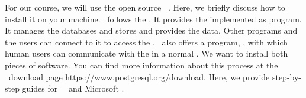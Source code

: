 %
%
\label{sec:installingPostgres}%
%
For our course, we will use the open source  \postgresql~\cite{TA2024DDAMWPAM,FP2023LP,OH2017PUAR,B2024PELUYDW}.
Here, we briefly discuss how to install it on your machine.
\postgresql\ follows the .
It provides the  implemented as  program.
It manages the databases and stores and provides the data.
Other programs and the users can connect to it to access the .
\postgresql\ also offers a  program, \psql, with which human users can communicate with the   in a normal .
We want to install both pieces of software.
You can find more information about this process at the \postgresql\ download page \url{https://www.postgresql.org/download}.
Here, we provide step-by-step guides for \ubuntu\ \linux\ and Microsoft \windows.%
%
%
%
%
\endhsection%
%
